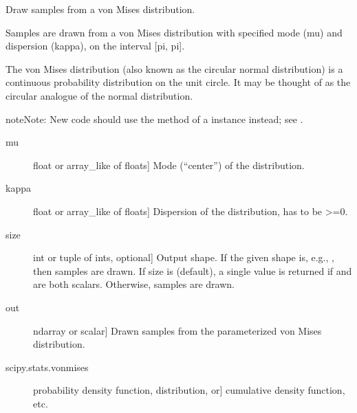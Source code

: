 \documentclass[letterpaper,10pt,english]{sphinxmanual}
\begin{document}
\begin{fulllineitems}
\label{\detokenize{infrapy.utils:infrapy.utils.ref2sac.vonmises}}
Draw samples from a von Mises distribution.

Samples are drawn from a von Mises distribution with specified mode
(mu) and dispersion (kappa), on the interval {[}\sphinxhyphen{}pi, pi{]}.

The von Mises distribution (also known as the circular normal
distribution) is a continuous probability distribution on the unit
circle.  It may be thought of as the circular analogue of the normal
distribution.

\begin{sphinxadmonition}{note}{Note:}
New code should use the  method of a 
instance instead; see .
\end{sphinxadmonition}
\begin{description}
\item[{mu}] \leavevmode{[}float or array\_like of floats{]}
Mode (“center”) of the distribution.

\item[{kappa}] \leavevmode{[}float or array\_like of floats{]}
Dispersion of the distribution, has to be \textgreater{}=0.

\item[{size}] \leavevmode{[}int or tuple of ints, optional{]}
Output shape.  If the given shape is, e.g., , then
 samples are drawn.  If size is  (default),
a single value is returned if  and  are both scalars.
Otherwise,  samples are drawn.

\end{description}
\begin{description}
\item[{out}] \leavevmode{[}ndarray or scalar{]}
Drawn samples from the parameterized von Mises distribution.

\end{description}
\begin{description}
\item[{scipy.stats.vonmises}] \leavevmode{[}probability density function, distribution, or{]}
cumulative density function, etc.


\end{description}
\end{fulllineitems}
\end{document}
